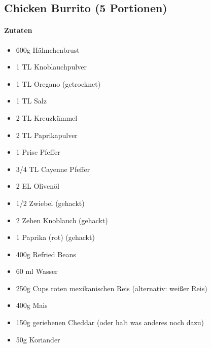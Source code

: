 \newpage
\subsection{Chicken Burrito (5 Portionen)}
\paragraph{Zutaten}
\begin{itemize}[noitemsep]
	\item 600g Hähnchenbrust
	\item 1 TL Knoblauchpulver
	\item 1 TL Oregano (getrocknet)
	\item 1 TL Salz
	\item 2 TL Kreuzkümmel
	\item 2 TL Paprikapulver
	\item 1 Prise Pfeffer
	\item 3/4 TL Cayenne Pfeffer
	\item 2 EL Olivenöl
	\item 1/2 Zwiebel (gehackt)
	\item 2 Zehen Knoblauch (gehackt)
	\item 1 Paprika (rot) (gehackt)
	\item 400g Refried Beans
	\item 60 ml Wasser
	\vspace{0.5cm}
	\item 250g Cups roten mexikanischen Reis (alternativ: weißer Reis)
	\item 400g Mais 
	\item 150g geriebenen Cheddar (oder halt was anderes noch dazu)
	\item 50g Koriander
\end{itemize}
